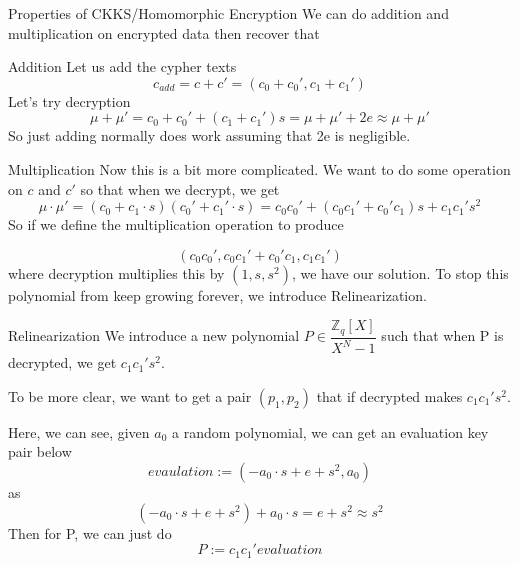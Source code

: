 \documentclass{beamer}
\begin{document}
	\begin{frame}{Properties of CKKS/Homomorphic Encryption}
		We can do addition and multiplication on encrypted data then recover that
	\end{frame}
	\begin{frame}{Addition}
		Let us add the cypher texts
		\begin{equation*}
			c_{add}=c+c'=(c_0+c_0', c_1+c_1')
		\end{equation*}
		Let's try decryption
		\begin{equation*}
			\mu+\mu' = c_0+c_0'+(c_1+c_1')s=\mu+\mu'+2e \approx \mu+\mu'
		\end{equation*}
		So just adding normally does work assuming that 2e is negligible.
	\end{frame}
	\begin{frame}{Multiplication}
		Now this is a bit more complicated. We want to do some operation on $c$ and $c'$ so that when we decrypt, we get
		\begin{equation*}
			\mu\cdot \mu' = (c_0+c_1\cdot s)(c_0'+c_1'\cdot s)=c_0c_0'+(c_0c_1'+c_0'c_1)s+c_1c_1's^2
		\end{equation*}
		So if we define the multiplication operation to produce
		
		\begin{equation*}
			(c_0c_0', c_0c_1'+c_0'c_1, c_1c_1')
		\end{equation*}
		where decryption multiplies this by $(1, s, s^2)$, we have our solution.
		To stop this polynomial from keep growing forever, we introduce Relinearization.
	\end{frame}
	\begin{frame}{Relinearization}
		We introduce a new polynomial $P \in \dfrac{\mathbb{Z}_{q}[X]}{X^N-1}$ such that when P is decrypted, we get $c_1c_1's^2$.
		
		To be more clear, we want to get a pair $(p_1, p_2)$ that if decrypted makes $c_1c_1's^2$.
		
		Here, we can see, given $a_0$ a random polynomial, we can get an evaluation key pair below
		\begin{equation*}
			evaulation := (-a_0\cdot s+e+s^2, a_0)
		\end{equation*}
		as
		\begin{equation*}
			(-a_0\cdot s+e+s^2)+a_0\cdot s = e+s^2 \approx s^2
		\end{equation*}
		Then for P, we can just do
		\begin{equation*}
			P := c_1c_1'evaluation
		\end{equation*}
	\end{frame}
\end{document}
